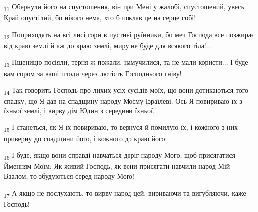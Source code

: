 \begin{tcolorbox}
\textsubscript{11} Обернули його на спустошення, він при Мені у жалобі, спустошений, увесь Край опустілий, бо нікого нема, хто б поклав це на серце собі!
\end{tcolorbox}
\begin{tcolorbox}
\textsubscript{12} Поприходять на всі лисі гори в пустині руїнники, бо меч Господа все позжирає від краю землі й аж до краю землі, миру не буде для всякого тіла!...
\end{tcolorbox}
\begin{tcolorbox}
\textsubscript{13} Пшеницю посіяли, терня ж пожали, намучилися, та не мали користи... І буде вам сором за ваші плоди через лютість Господнього гніву!
\end{tcolorbox}
\begin{tcolorbox}
\textsubscript{14} Так говорить Господь про лихих усіх сусідів моїх, що вони дотикаються того спадку, що Я дав на спадщину народу Моєму Ізраїлеві: Ось Я повириваю їх з їхньої землі, і вирву дім Юдин з середини їхньої.
\end{tcolorbox}
\begin{tcolorbox}
\textsubscript{15} І станеться, як Я їх повириваю, то вернуся й помилую їх, і кожного з них приверну до спадщини його, і кожного до краю його.
\end{tcolorbox}
\begin{tcolorbox}
\textsubscript{16} І буде, якщо вони справді навчаться доріг народу Мого, щоб присягатися Йменням Моїм: Як живий Господь, як вони присягати навчили народ Мій Ваалом, то збудуються серед народу Мого!
\end{tcolorbox}
\begin{tcolorbox}
\textsubscript{17} А якщо не послухають, то вирву народ цей, вириваючи та вигубляючи, каже Господь!
\end{tcolorbox}
